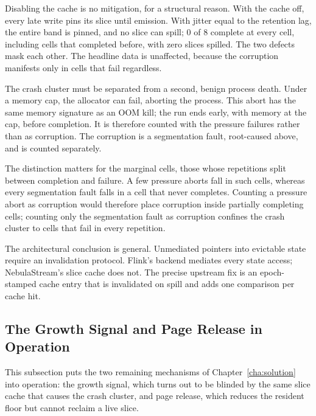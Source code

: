Disabling the cache is no mitigation, for a structural reason.
With the cache off, every late write pins its slice until emission.
With jitter equal to the retention lag, the entire band is pinned, and no slice can spill; 0 of 8 complete at every cell, including cells that completed before, with zero slices spilled.
The two defects mask each other.
The headline data is unaffected, because the corruption manifests only in cells that fail regardless.

The crash cluster must be separated from a second, benign process death.
Under a memory cap, the allocator can fail, aborting the process.
This abort has the same memory signature as an OOM kill; the run ends early, with memory at the cap, before completion.
It is therefore counted with the pressure failures rather than as corruption.
The corruption is a segmentation fault, root-caused above, and is counted separately.

The distinction matters for the marginal cells, those whose repetitions split between completion and failure.
A few pressure aborts fall in such cells, whereas every segmentation fault falls in a cell that never completes.
Counting a pressure abort as corruption would therefore place corruption inside partially completing cells; counting only the segmentation fault as corruption confines the crash cluster to cells that fail in every repetition.

The architectural conclusion is general.
Unmediated pointers into evictable state require an invalidation protocol.
Flink's backend mediates every state access; NebulaStream's slice cache does not.
The precise upstream fix is an epoch-stamped cache entry that is invalidated on spill and adds one comparison per cache hit.

\FloatBarrier
\subsection{The Growth Signal and Page Release in Operation\label{sec:growth-release-results}}

This subsection puts the two remaining mechanisms of Chapter~\ref{cha:solution} into operation: the growth signal, which turns out to be blinded by the same slice cache that causes the crash cluster, and page release, which reduces the resident floor but cannot reclaim a live slice.

